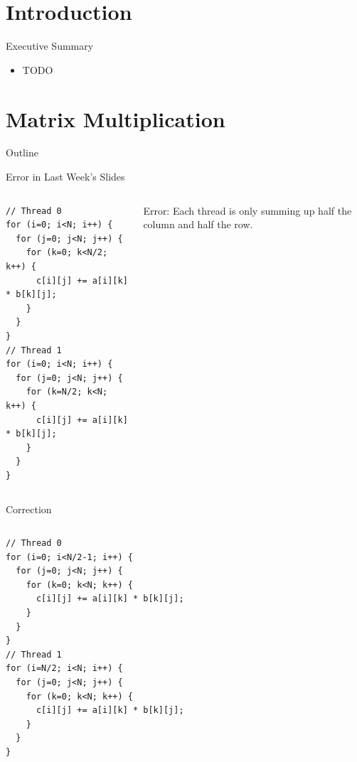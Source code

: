 \section*{Introduction}

\begin{frame}{Executive Summary}
  \begin{itemize}
  \item TODO
  \end{itemize}
\end{frame}


\section{Matrix Multiplication}

\begin{frame}{Outline}
  \tableofcontents[current]
\end{frame}

\begin{frame}[fragile]{Error in Last Week's Slides}
  \begin{columns}[c]
    \begin{column}{0.75\textwidth}
\begin{lstlisting}[basicstyle=\fontsize{11}{13}\selectfont\ttfamily]
// Thread 0
for (i=0; i<N; i++) {
  for (j=0; j<N; j++) {
    for (k=0; k<N/2; k++) {
      c[i][j] += a[i][k] * b[k][j];
    }
  }
}
// Thread 1
for (i=0; i<N; i++) {
  for (j=0; j<N; j++) {
    for (k=N/2; k<N; k++) {
      c[i][j] += a[i][k] * b[k][j];
    }
  }
}
\end{lstlisting}      
    \end{column}
    \begin{column}{0.25\textwidth}
      \pause

      \alert{Error:} Each thread is only summing up half the column
      and half the row.
    \end{column}
  \end{columns}
\end{frame}

\begin{frame}[fragile]{Correction}
  \begin{columns}[c]
    \begin{column}{0.75\textwidth}
\begin{lstlisting}[basicstyle=\fontsize{11}{13}\selectfont\ttfamily]
// Thread 0
for (i=0; i<N/2-1; i++) {
  for (j=0; j<N; j++) {
    for (k=0; k<N; k++) {
      c[i][j] += a[i][k] * b[k][j];
    }
  }
}
// Thread 1
for (i=N/2; i<N; i++) {
  for (j=0; j<N; j++) {
    for (k=0; k<N; k++) {
      c[i][j] += a[i][k] * b[k][j];
    }
  }
}
\end{lstlisting}
    \end{column}
    \begin{column}{0.25\textwidth}
    \end{column}
  \end{columns}
\end{frame}

